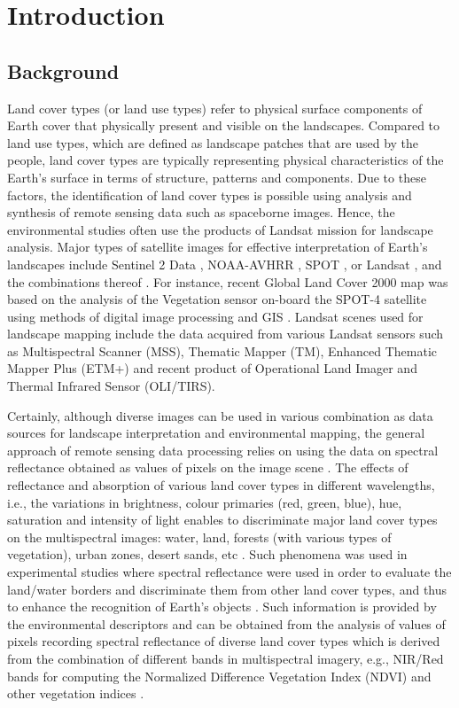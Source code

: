 \documentclass[land,article,submit,pdftex,moreauthors]{Definitions/mdpi}
\begin{document}
\section{Introduction}

\subsection{Background}
Land cover types (or land use types) refer to physical surface components of Earth cover that physically present and visible on the landscapes. Compared to land use types, which are defined as landscape patches that are used by the people, land cover types are typically representing physical characteristics of the Earth's surface in terms of structure, patterns and components. Due to these factors, the identification of land cover types is possible using analysis and synthesis of remote sensing data such as spaceborne images. Hence, the environmental studies often use the products of Landsat mission for landscape analysis. Major types of satellite images for effective interpretation of Earth's landscapes include Sentinel 2 Data \cite{Ngom,TONG2020111598}, NOAA-AVHRR \cite{KONARSKA2002491,ANYAMBA2005596,Frederiksen}, SPOT \cite{SILVA2005188,MARTINEZ2011152}, or Landsat \cite{PIMPLE2020118007,Lemenkova202315}, and the combinations thereof \cite{rs12193157}. For instance, recent Global Land Cover 2000 map was based on the analysis of the Vegetation sensor on-board the SPOT-4 satellite using methods of digital image processing and GIS \cite{Mayaux}. Landsat scenes used for landscape mapping include the data acquired from various Landsat sensors such as Multispectral Scanner (MSS), Thematic Mapper (TM), Enhanced Thematic Mapper Plus (ETM+) and recent product of Operational Land Imager and Thermal Infrared Sensor (OLI/TIRS).

Certainly, although diverse images can be used in various combination as data sources for landscape interpretation and environmental mapping, the general approach of remote sensing data processing relies on using the data on spectral reflectance obtained as values of pixels on the image scene \cite{ACKER2014}. The effects of reflectance and absorption of various land cover types in different wavelengths, i.e., the variations in brightness, colour primaries (red, green, blue), hue, saturation and intensity of light enables to discriminate major land cover types on the multispectral images: water, land, forests (with various types of vegetation), urban zones, desert sands, etc \cite{rs12101634}. Such phenomena was used in experimental studies where spectral reflectance were used in order to evaluate the land/water borders and discriminate them from other land cover types, and thus to enhance the recognition of Earth's objects \cite{rs13132454}. Such information is provided by the environmental descriptors and can be obtained from the analysis of values of pixels recording spectral reflectance of diverse land cover types which is derived from the combination of different bands in multispectral imagery, e.g., NIR/Red bands for computing the Normalized Difference Vegetation Index (NDVI) and other vegetation indices \cite{CRIPPEN199071,LI2004463,jmse11040871,RUAN2022157075}.
\end{document}
